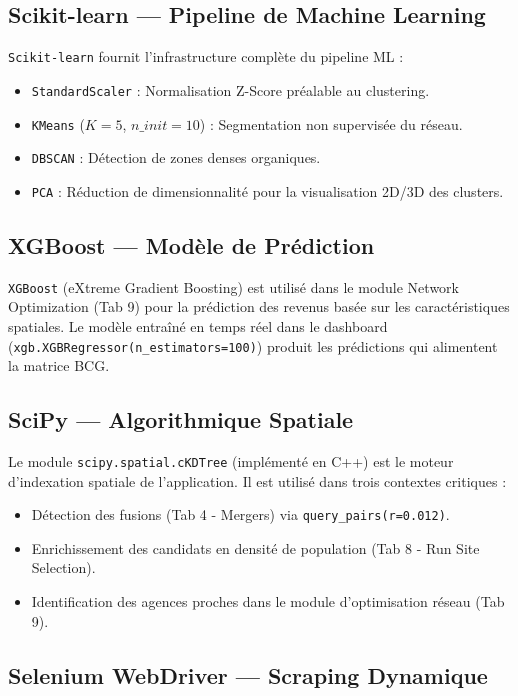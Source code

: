 \documentclass[11pt,a4paper,twoside]{report}
\begin{document}
\subsection{Scikit-learn — Pipeline de Machine Learning}

\texttt{Scikit-learn} \cite{scikit2011} fournit l'infrastructure complète du pipeline ML :
\begin{itemize}
    \item \texttt{StandardScaler} : Normalisation Z-Score préalable au clustering.
    \item \texttt{KMeans} ($K=5$, $n\_init=10$) : Segmentation non supervisée du réseau.
    \item \texttt{DBSCAN} : Détection de zones denses organiques.
    \item \texttt{PCA} : Réduction de dimensionnalité pour la visualisation 2D/3D des clusters.
\end{itemize}

\subsection{XGBoost — Modèle de Prédiction}

\texttt{XGBoost} (eXtreme Gradient Boosting) est utilisé dans le module Network Optimization (Tab 9) pour la prédiction des revenus basée sur les caractéristiques spatiales. Le modèle entraîné en temps réel dans le dashboard (\texttt{xgb.XGBRegressor(n\_estimators=100)}) produit les prédictions qui alimentent la matrice BCG.

\subsection{SciPy — Algorithmique Spatiale}

Le module \texttt{scipy.spatial.cKDTree} (implémenté en C++) est le moteur d'indexation spatiale de l'application. Il est utilisé dans trois contextes critiques :
\begin{itemize}
    \item Détection des fusions (Tab 4 - Mergers) via \texttt{query\_pairs(r=0.012)}.
    \item Enrichissement des candidats en densité de population (Tab 8 - Run Site Selection).
    \item Identification des agences proches dans le module d'optimisation réseau (Tab 9).
\end{itemize}

\subsection{Selenium WebDriver — Scraping Dynamique}
\end{document}
